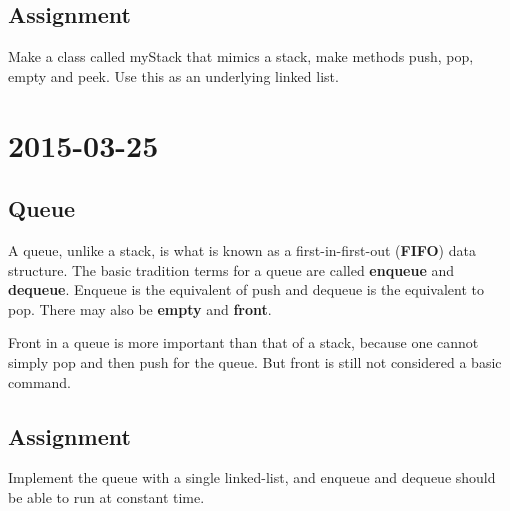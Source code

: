 \documentclass [12 pt, twoside] {article}
\begin{document}
\subsection{Assignment}
Make a class called myStack that mimics a stack, make methods push, pop, empty
and peek. Use this as an underlying linked list.

\section{2015-03-25}
\subsection{Queue}
A queue, unlike a stack, is what is known as a first-in-first-out
(\textbf{FIFO}) data structure. The basic tradition terms for a queue are called
\textbf{enqueue} and \textbf{dequeue}. Enqueue is the equivalent of push and
dequeue is the equivalent to pop. There may also be \textbf{empty} and
\textbf{front}.

Front in a queue is more important than that of a stack, because one cannot
simply pop and then push for the queue. But front is still not considered a
basic command.

\subsection{Assignment}
Implement the queue with a single linked-list, and enqueue and dequeue should be
able to run at constant time.
\end{document}
